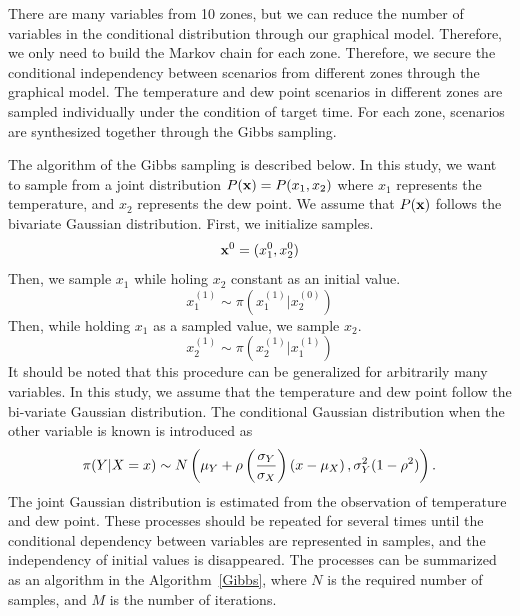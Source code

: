 \documentclass[journal]{IEEEtran} %
\begin{document}
There are many variables from 10 zones, but we can reduce the number of variables in the conditional distribution through our graphical model. Therefore, we only need to build the Markov chain for each zone. Therefore, we secure the conditional independency between scenarios from different zones through the graphical model. The temperature and dew point scenarios in different zones are sampled individually under the condition of target time. For each zone, scenarios are synthesized together through the Gibbs sampling.
  



The algorithm of the Gibbs sampling is described below. In this study, we want to sample from a joint distribution $P({\bf{x}}) = P({x_1},{x_2})$ where $x_1$ represents the temperature, and $x_2$ represents the dew point. We assume that $P({\bf{x}})$ follows the bivariate Gaussian distribution.
First, we initialize samples.
\begin{equation}
\label{Initialize}
{{\bf{x}}^0} = ({x_1^0},{x_2^0})
\end{equation}
Then, we sample $x_1$ while holing $x_2$ constant as an initial value.
\begin{equation}
\label{X1sample}
x_1^{(1)} \sim \pi (x_1^{(1)}|x_2^{(0)})
\end{equation}
Then, while holding $x_1$ as a sampled value, we sample $x_2$. 
\begin{equation}
\label{X1sample}
x_2^{(1)} \sim \pi (x_2^{(1)}|x_1^{(1)})
\end{equation}
It should be noted that this procedure can be generalized for arbitrarily many variables.
In this study, we assume that the temperature and dew point follow the bi-variate Gaussian distribution. The conditional Gaussian distribution when the other variable is known is introduced as
\begin{equation}
\label{ConditionalDist}
\small
\begin{aligned}
\pi(Y|X = x) \sim N\left( {{\mu _Y} + \rho \left( {\frac{{{\sigma _Y}}}{{{\sigma _X}}}} \right)\left( {x - {\mu _X}} \right),\sigma _Y^2(1 - {\rho ^2})} \right).
\end{aligned}
\end{equation}
The joint Gaussian distribution is estimated from the observation of temperature and dew point.
%
These processes should be repeated for several times until the conditional dependency between variables are represented in samples, and the independency of initial values is disappeared. The processes can be summarized as an algorithm in the Algorithm~\ref{Gibbs}, where $N$ is the required number of samples, and $M$ is the number of iterations.
\end{document}
